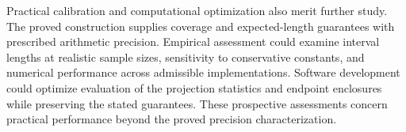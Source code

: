 Practical calibration and computational optimization also merit further study. The proved construction supplies coverage and expected-length guarantees with prescribed arithmetic precision. Empirical assessment could examine interval lengths at realistic sample sizes, sensitivity to conservative constants, and numerical performance across admissible implementations. Software development could optimize evaluation of the projection statistics and endpoint enclosures while preserving the stated guarantees. These prospective assessments concern practical performance beyond the proved precision characterization.
